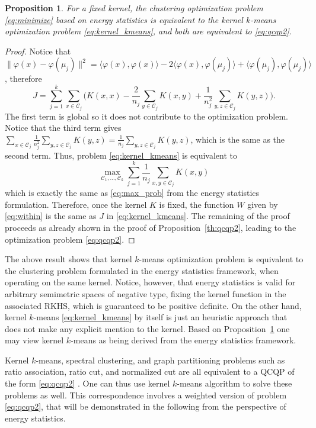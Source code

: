 \documentclass[aps,preprint,nofootinbib,floatfix]{revtex4-1}
\newtheorem{proposition}[theorem]{Proposition}
\newcommand\kk{K}
\newcommand\C{{\mathcal{C}}}
\begin{document}
\begin{proposition}
\label{th:kernel_kmeans}
For a fixed kernel,
the clustering optimization problem
\eqref{eq:minimize} based on energy statistics 
is equivalent to the kernel $k$-means optimization problem
\eqref{eq:kernel_kmeans}, and both are equivalent to \eqref{eq:qcqp2}.
\end{proposition}
\begin{proof}
Notice that $\| \varphi(x) - \varphi(\mu_j) \|^2 = 
\langle \varphi(x), \varphi(x) \rangle
- 2 \langle \varphi(x), \varphi(\mu_j) \rangle +
\langle \varphi(\mu_j), \varphi(\mu_j)\rangle$,
therefore
\begin{equation}
\label{eq:J}
J = \sum_{j=1}^k \sum_{x\in\C_j} \bigg(
\kk(x,x) - 
\dfrac{2}{n_j} \sum_{y\in \C_j} \kk(x,y) + \dfrac{1}{n_j^2}
\sum_{y,z \in \C_j} \kk(y,z) \bigg).
\end{equation}
The first term is global so it does not contribute to the optimization
problem. Notice that the third term gives
$\sum_{x\in\C_j} \tfrac{1}{n_j^2} \sum_{y,z\in\C_j} \kk(y,z) =
\tfrac{1}{n_j}\sum_{y,z\in\C_j} \kk(y,z)$, which is the same as
the second term. Thus, problem
\eqref{eq:kernel_kmeans} is equivalent to
\begin{equation}
\max_{\C_1,\dotsc,\C_k}
\sum_{j=1}^k \dfrac{1}{n_j} \sum_{x,y \in\C_j} \kk(x,y) 
\end{equation}
which is exactly the same as 
\eqref{eq:max_prob} from the energy statistics formulation. Therefore,
once the kernel $\kk$ is fixed, the function 
$W$ given by \eqref{eq:within} is the same
as $J$ in \eqref{eq:kernel_kmeans}.
The remaining of the proof proceeds as 
already shown in the proof of Proposition~\ref{th:qcqp2}, leading to
the optimization problem \eqref{eq:qcqp2}.
\end{proof}

The above result shows that 
kernel $k$-means optimization problem is equivalent to the clustering problem
formulated in the energy statistics framework, when operating on the same
kernel. Notice, however, that 
energy statistics is valid for arbitrary semimetric spaces of
negative type, fixing the kernel function in the associated RKHS, which
is guaranteed to be positive definite. On the other hand, 
kernel $k$-means \eqref{eq:kernel_kmeans} by itself is just an heuristic 
approach that does not make any explicit mention to the kernel. 
Based on Proposition~\ref{th:kernel_kmeans}
one may view kernel $k$-means as being derived from the energy statistics
framework.

Kernel $k$-means, spectral clustering,
and graph partitioning problems such as ratio association, ratio cut, and
normalized cut are all equivalent to a QCQP of the form \eqref{eq:qcqp2}
\cite{Dhillon2,Dhillon}.
One can thus use kernel $k$-means algorithm to solve these problems as well.
This correspondence involves a weighted version of problem 
\eqref{eq:qcqp2}, that
will be demonstrated in the following from the perspective 
of energy statistics.
\end{document}
